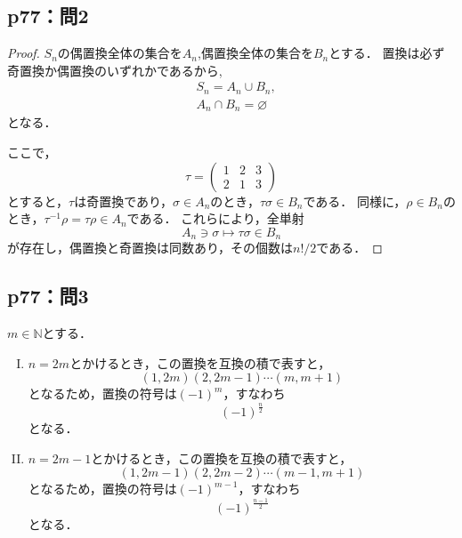 \documentclass[uplatex,dvipdfmx,a4paper,10pt,fleqn]{jsarticle}
\begin{document}
\subsection*{p77：問2}

\begin{tleftbar}
    \begin{proof}
$S_n$の偶置換全体の集合を$A_n$,偶置換全体の集合を$B_n$とする．
置換は必ず奇置換か偶置換のいずれかであるから, 
\begin{align*} 
    & S_n = A_n \cup B_n , \\
    &A_n \cap B_n = \varnothing
\end{align*} 
となる．

ここで，
\[
    \tau = \begin{pmatrix} 1 & 2 & 3 \\ 2 & 1 & 3 \end{pmatrix}
\]
とすると，$\tau$は奇置換であり，$\sigma \in  A_n$のとき，$ \tau \sigma \in B_n$である．
同様に，$ \rho  \in B_n$のとき，$\tau^{-1} \rho = \tau \rho \in A_n$である．
これらにより，全単射
\[
    A_n \ni \sigma \mapsto \tau \sigma \in B_n
\]
が存在し，偶置換と奇置換は同数あり，その個数は$n! /2$である．
\end{proof}
\end{tleftbar}


\subsection*{p77：問3}

\begin{leftbar}
    $m \in \mathbb{N}$とする．
    \begin{enumerate}[(I)]
        \item $n=2m$とかけるとき，この置換を互換の積で表すと，
        \[
            (1,2m)(2,2m-1) \dotsm (m,m+1)
        \] 
        となるため，置換の符号は$(-1)^m$，すなわち
        \[
            (-1)^{\frac{n}{2}}
        \]
        となる．
        \item $n=2m-1$とかけるとき，この置換を互換の積で表すと，
        \[
            (1,2m-1)(2,2m-2) \dotsm (m-1,m+1)
        \] 
        となるため，置換の符号は$(-1)^{m-1}$，すなわち
        \[
            (-1)^{\frac{n-1}{2}}
        \]
        となる．
    \end{enumerate}
\end{leftbar}
\end{document}
